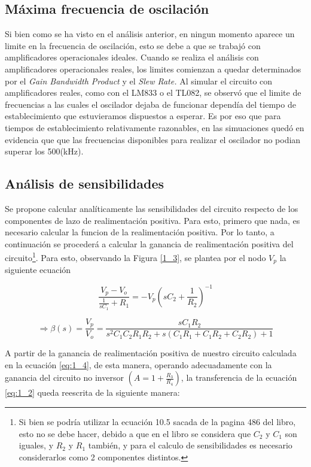 \subsection{Máxima frecuencia de oscilación}

Si bien como se ha visto en el análisis anterior, en ningun momento
aparece un limite en la frecuencia de oscilación, esto se debe a que
se trabajó con amplificadores operacionales ideales. Cuando se realiza
el análisis con amplificadores operacionales reales, los limites comienzan
a quedar determinados por el \emph{Gain Bandwidth Product} y el \emph{Slew
Rate. }Al simular el circuito con amplificadores reales, como con
el LM833 o el TL082, se observó que el limite de frecuencias a las
cuales el oscilador dejaba de funcionar dependía del tiempo de establecimiento
que estuvieramos dispuestos a esperar. Es por eso que para tiempos
de establecimiento relativamente razonables, en las simuaciones quedó
en evidencia que que las frecuencias disponibles para realizar el
oscilador no podian superar los 500(kHz).

\subsection{Análisis de sensibilidades}

Se propone calcular analíticamente las sensibilidades del circuito
respecto de los componentes de lazo de realimentación positiva. Para
esto, primero que nada, es necesario calcular la funcion de la realimentación
positiva. Por lo tanto, a continuación se procederá a calcular la
ganancia de realimentación positiva del circuito\footnote{Si bien se podría utilizar la ecuación 10.5 sacada de la pagina 486
del libro, esto no se debe hacer, debido a que en el libro se considera
que $C_{2}$ y $C_{1}$ son iguales, y $R_{2}$ y $R_{1}$ también,
y para el calculo de sensibilidades es necesario considerarlos como
2 componentes distintos.}. Para esto, observando la Figura \ref{1_3}, se plantea por el nodo
$V_{p}$ la siguiente ecuación

\[
\frac{V_{p}-V_{o}}{\frac{1}{sC_{1}}+R_{1}}=-V_{p}\left(sC_{2}+\frac{1}{R_{2}}\right)^{-1}
\]

\begin{equation}
\Rightarrow\beta(s)=\frac{V_{p}}{V_{o}}=\frac{sC_{1}R_{2}}{s^{2}C_{1}C_{2}R_{1}R_{2}+s\left(C_{1}R_{1}+C_{1}R_{2}+C_{2}R_{2}\right)+1}\label{eq:1_4}
\end{equation}

A partir de la ganancia de realimentación positiva de nuestro circuito
calculada en la ecuación \ref{eq:1_4}, de esta manera, operando adecuadamente
con la ganancia del circuito no inversor $(A=1+\frac{R_{3}}{R_{4}})$,
la transferencia de la ecuación \ref{eq:1_2} queda reescrita de la
siguiente manera:


